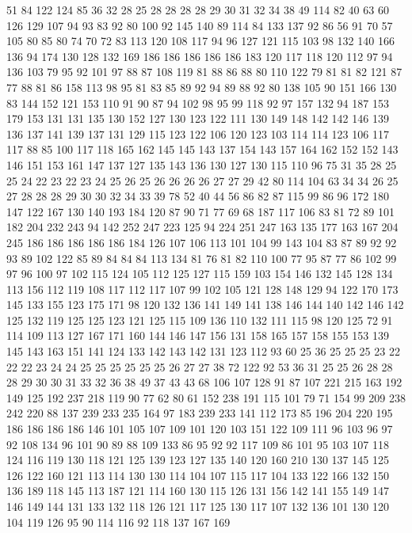 51 84 122 124 85 36 32 28 25 28 28 28 28 29 30 31 32 34 38 49
114 82 40 63 60 126 129 107 94 93 83 92 80 100 92 145 140 89 114 84
133 137 92 86 56 91 70 57 105 80 85 80 74 70 72 83 113 120 108 117
94 96 127 121 115 103 98 132 140 166 136 94 174 130 128 132 169 186 186 186
186 186 183 120 117 118 120 112 97 94 136 103 79 95 92 101 97 88 87 108
119 81 88 86 88 80 110 122 79 81 81 82 121 87 77 88 81 86 158 113
98 95 81 83 85 89 92 94 89 88 92 80 138 105 90 151 166 130 83 144
152 121 153 110 91 90 87 94 102 98 95 99 118 92 97 157 132 94 187 153
179 153 131 131 135 130 152 127 130 123 122 111 130 149 148 142 142 146 139 136
137 141 139 137 131 129 115 123 122 106 120 123 103 114 114 123 106 117 117 88
85 100 117 118 165 162 145 145 143 137 154 143 157 164 162 152 152 143 146 151
153 161 147 137 127 135 143 136 130 127 130 115 110 96 75 31 35 28 25 25
24 22 23 22 23 24 25 26 25 26 26 26 26 27 27 29 42 80 114 104
63 34 34 26 25 27 28 28 28 29 30 30 32 34 33 39 78 52 40 44
56 86 82 87 115 99 86 96 172 180 147 122 167 130 140 193 184 120 87 90
71 77 69 68 187 117 106 83 81 72 89 101 182 204 232 243 94 142 252 247
223 125 94 224 251 247 163 135 177 163 167 204 245 186 186 186 186 186 184 126
107 106 113 101 104 99 143 104 83 87 89 92 92 93 89 102 122 85 89 84
84 84 113 134 81 76 81 82 110 100 77 95 87 77 86 102 99 97 96 100
97 102 115 124 105 112 125 127 115 159 103 154 146 132 145 128 134 113 156 112
119 108 117 112 117 107 99 102 105 121 128 148 129 94 122 170 173 145 133 155
123 175 171 98 120 132 136 141 149 141 138 146 144 140 142 146 142 125 132 119
125 125 123 121 125 115 109 136 110 132 111 115 98 120 125 72 91 114 109 113
127 167 171 160 144 146 147 156 131 158 165 157 158 155 153 139 145 143 163 151
141 124 133 142 143 142 131 123 112 93 60 25 36 25 25 25 23 22 22 22
23 24 24 25 25 25 25 25 25 26 27 27 38 72 122 92 53 36 31 25
25 26 28 28 28 29 30 30 31 33 32 36 38 49 37 43 43 68 106 107
128 91 87 107 221 215 163 192 149 125 192 237 218 119 90 77 62 80 61 152
238 191 115 101 79 71 154 99 209 238 242 220 88 137 239 233 235 164 97 183
239 233 141 112 173 85 196 204 220 195 186 186 186 186 146 101 105 107 109 101
120 103 151 122 109 111 96 103 96 97 92 108 134 96 101 90 89 88 109 133
86 95 92 92 117 109 86 101 95 103 107 118 124 116 119 130 118 121 125 139
123 127 135 140 120 160 210 130 137 145 125 126 122 160 121 113 114 130 130 114
104 107 115 117 104 133 122 166 132 150 136 189 118 145 113 187 121 114 160 130
115 126 131 156 142 141 155 149 147 146 149 144 131 133 132 118 126 121 117 125
130 117 107 132 136 101 130 120 104 119 126 95 90 114 116 92 118 137 167 169
